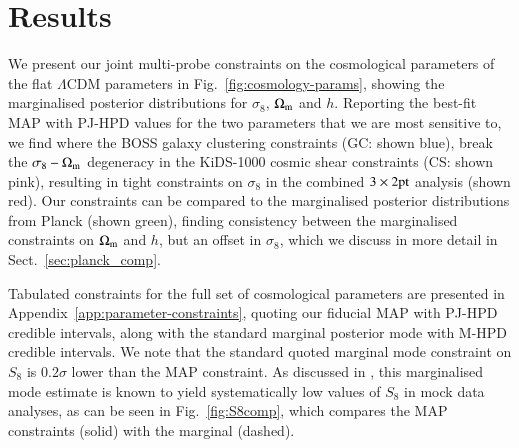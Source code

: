 \section{Results}
\label{sec:results}
We present our joint multi-probe constraints on the cosmological parameters of the flat $\Lambda$CDM parameters in Fig.~\ref{fig:cosmology-params}, showing the marginalised posterior distributions for $\sigma_8$, $\Omega_{\rm m}$ and $h$.   Reporting the best-fit MAP with PJ-HPD values for the two parameters that we are most sensitive to, we find 
where the BOSS galaxy clustering constraints (GC: shown blue), break the $\sigma_8-\Omega_{\rm m}$ degeneracy in the KiDS-1000 cosmic shear constraints (CS: shown pink), resulting in tight constraints on $\sigma_8$ in the combined $3\times2{\rm pt}$ analysis (shown red).   Our constraints can be compared to the marginalised posterior distributions from Planck (shown green), finding consistency between the marginalised constraints on $\Omega_{\rm m}$ and $h$, but an offset in $\sigma_8$,  which we discuss in more detail in Sect.~\ref{sec:planck_comp}.

Tabulated constraints for the full set of cosmological parameters are presented in Appendix~\ref{app:parameter-constraints}, quoting our fiducial MAP with PJ-HPD credible intervals, along with the standard marginal posterior mode with M-HPD credible intervals.   We note that the standard quoted marginal mode constraint on $S_8$ is $0.2\sigma$ lower than the MAP constraint.  As discussed in \citet{joachimi/etal:inprep}, this marginalised mode estimate is known to yield systematically low values of $S_8$ in mock data analyses, as can be seen in Fig.~\ref{fig:S8comp}, which compares the MAP constraints (solid) with the marginal (dashed).  

